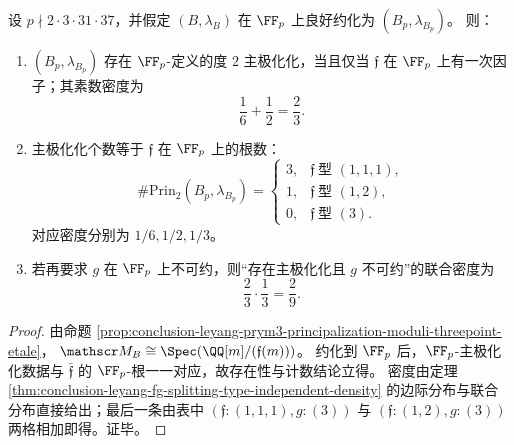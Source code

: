 \begin{corollary}\label{cor:conclusion-leyang-prym3-finitefield-principalization-frequency}
设 \(p\nmid 2\cdot 3\cdot 31\cdot 37\)，并假定 \((B,\lambda_B)\) 在 \(\FF_p\) 上良好约化为 \((B_p,\lambda_{B_p})\)。
则：
\begin{enumerate}
  \item \((B_p,\lambda_{B_p})\) 存在 \(\FF_p\)-定义的度 \(2\) 主极化化，当且仅当 \(\mathfrak f\) 在 \(\FF_p\) 上有一次因子；其素数密度为
  \[
  \frac16+\frac12=\frac23.
  \]
  \item 主极化化个数等于 \(\mathfrak f\) 在 \(\FF_p\) 上的根数：
  \[
  \#\mathrm{Prin}_2(B_p,\lambda_{B_p})=
  \begin{cases}
  3,&\mathfrak f\ \text{型 }(1,1,1),\\
  1,&\mathfrak f\ \text{型 }(1,2),\\
  0,&\mathfrak f\ \text{型 }(3).
  \end{cases}
  \]
  对应密度分别为 \(1/6,1/2,1/3\)。
  \item 若再要求 \(g\) 在 \(\FF_p\) 上不可约，则“存在主极化化且 \(g\) 不可约”的联合密度为
  \[
  \frac23\cdot\frac13=\frac29.
  \]
\end{enumerate}
\end{corollary}
\begin{proof}
由命题 \ref{prop:conclusion-leyang-prym3-principalization-moduli-threepoint-etale}，
\(\mathscr M_B\cong \Spec(\QQ[m]/(\mathfrak f(m)))\)。
约化到 \(\FF_p\) 后，\(\FF_p\)-主极化化数据与 \(\bar{\mathfrak f}\) 的 \(\FF_p\)-根一一对应，故存在性与计数结论立得。
密度由定理 \ref{thm:conclusion-leyang-fg-splitting-type-independent-density} 的边际分布与联合分布直接给出；最后一条由表中
\((\mathfrak f:(1,1,1),g:(3))\) 与 \((\mathfrak f:(1,2),g:(3))\) 两格相加即得。证毕。
\end{proof}

